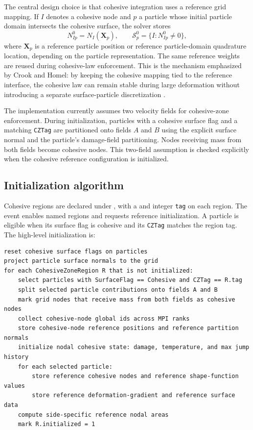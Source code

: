 The central design choice is that cohesive integration uses a reference grid mapping.  If $I$ denotes a cohesive node and $p$ a particle whose initial particle domain intersects the cohesive surface, the solver stores
\begin{equation}
  N^0_{Ip}=N_I(\mathbf{X}_p),
  \qquad
  \mathcal{S}_p^0=\{I:N^0_{Ip}\ne 0\},
\end{equation}
where $\mathbf{X}_p$ is a reference particle position or reference particle-domain quadrature location, depending on the particle representation.  The same reference weights are reused during cohesive-law enforcement.  This is the mechanism emphasized by Crook and Homel: by keeping the cohesive mapping tied to the reference interface, the cohesive law can remain stable during large deformation without introducing a separate surface-particle discretization \cite{crook2025cohesive}.

The implementation currently assumes two velocity fields for cohesive-zone enforcement.  During initialization, particles with a cohesive surface flag and a matching \texttt{CZTag} are partitioned onto fields $A$ and $B$ using the explicit surface normal and the particle's damage-field partitioning.  Nodes receiving mass from both fields become cohesive nodes.  This two-field assumption is checked explicitly when the cohesive reference configuration is initialized.

\subsection{Initialization algorithm}

Cohesive regions are declared under , with a  and integer \texttt{tag} on each region. The  event enables named regions and requests reference initialization. A particle is eligible when its surface flag is cohesive and its \texttt{CZTag} matches the region tag. The high-level initialization is:

\begin{lstlisting}[caption={Cohesive-zone reference-configuration initialization.}]
reset cohesive surface flags on particles
project particle surface normals to the grid
for each CohesiveZoneRegion R that is not initialized:
    select particles with SurfaceFlag == Cohesive and CZTag == R.tag
    split selected particle contributions onto fields A and B
    mark grid nodes that receive mass from both fields as cohesive nodes
    collect cohesive-node global ids across MPI ranks
    store cohesive-node reference positions and reference partition normals
    initialize nodal cohesive state: damage, temperature, and max jump history
    for each selected particle:
        store reference cohesive nodes and reference shape-function values
        store reference deformation-gradient and reference surface data
    compute side-specific reference nodal areas
    mark R.initialized = 1
\end{lstlisting}

